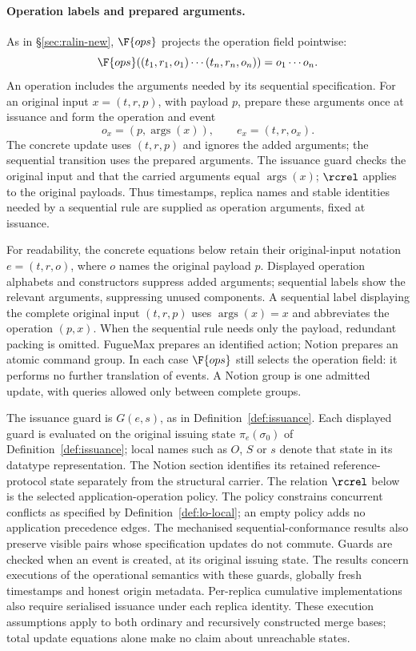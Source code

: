 \paragraph{Operation labels and prepared arguments.}
As in \S\ref{sec:ralin-new}, $\F{ops}$ projects the operation field
pointwise:
\[
\F{ops}((t_1,r_1,o_1)\cdots(t_n,r_n,o_n))=o_1\cdots o_n.
\]
An operation includes the arguments needed by its sequential specification.
For an original input $x=(t,r,p)$, with payload $p$, prepare these arguments
once at issuance and form the operation and event
\[
o_x=(p,\operatorname{args}(x)),\qquad e_x=(t,r,o_x).
\]
The concrete update uses $(t,r,p)$ and ignores the added arguments; the
sequential transition uses the prepared arguments. The issuance guard checks
the original input and that the carried arguments equal $\operatorname{args}(x)$;
$\rcrel$ applies to the original payloads.
Thus timestamps, replica names and stable identities needed by a sequential
rule are supplied as operation arguments, fixed at issuance.

For readability, the concrete equations below retain their original-input
notation $e=(t,r,o)$, where $o$ names the original payload $p$.
Displayed operation alphabets and constructors suppress added arguments;
sequential labels show the relevant arguments, suppressing unused components.
A sequential label displaying the complete original input $(t,r,p)$ uses
$\operatorname{args}(x)=x$ and abbreviates the operation $(p,x)$.
When the sequential rule needs only the payload, redundant packing is omitted.
FugueMax prepares an identified action; Notion prepares an atomic command
group. In each case $\F{ops}$ still selects the operation field: it performs
no further translation of events. A Notion group is one admitted update,
with queries allowed only between complete groups.

The issuance guard is $G(e,s)$, as in Definition~\ref{def:issuance}.
Each displayed guard is evaluated on the original issuing state
$\pi_e(\sigma_0)$ of Definition~\ref{def:issuance}; local names such as
$O$, $S$ or $s$ denote that state in its datatype representation. The Notion section identifies
its retained reference-protocol state separately from the structural carrier.
The relation $\rcrel$ below is the selected application-operation policy.
The policy constrains concurrent conflicts as specified by
Definition~\ref{def:lo-local}; an empty policy adds no application precedence
edges. The mechanised sequential-conformance results also preserve visible
pairs whose specification updates do not commute.
Guards are checked when an event is created, at its original issuing state.
The results concern executions of the operational semantics with these guards,
globally fresh timestamps and honest origin metadata. Per-replica cumulative
implementations also require serialised issuance under each replica identity.
These execution assumptions apply to both ordinary and recursively constructed
merge bases; total update equations alone make no claim about unreachable states.

